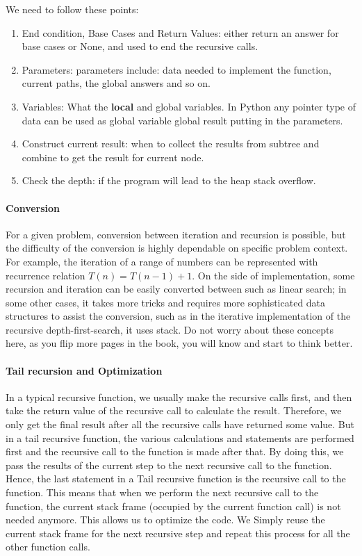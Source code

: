 \documentclass[../main.tex]{subfiles}
\begin{document}
We need to follow these points:
\begin{enumerate}
    \item End condition, Base Cases and Return Values: either return an answer for base cases or None, and used to end the recursive calls.  
    \item Parameters: parameters include: data needed to implement the function, current paths, the global answers and so on. 
    \item Variables: What the \textbf{local} and {global} variables. In Python any pointer type of data can be used as global variable global result putting in the parameters. 
    \item Construct current result: when to collect the results from subtree and combine to get the result for current node.
    \item Check the depth: if the program will lead to the heap stack overflow.
\end{enumerate}


\paragraph{Conversion} For a given problem, conversion between iteration and recursion is possible, but the difficulty of the conversion is highly dependable on specific problem context. For example, the iteration of a range of numbers can be represented with recurrence relation $T(n)=T(n-1)+1$. On the side of implementation, some recursion and iteration can be easily converted between such as linear search; in some other cases, it takes more tricks and requires more sophisticated data structures to assist the conversion, such as in the iterative implementation of the recursive depth-first-search, it uses stack. Do not worry about these concepts here, as you flip more pages in the book, you will know and start to think better. 

\paragraph{Tail recursion and Optimization}

In a typical recursive function, we usually make the recursive calls first, and then take the return value of the recursive call to calculate the result. Therefore, we only get the final result after all the recursive calls have returned some value. But in a tail recursive function, the various calculations and statements are performed first and the recursive call to the function is made after that. By doing this, we pass the results of the current step to the next recursive call to the function. Hence, the last statement in a Tail recursive function is the recursive call to the function.
This means that when we perform the next recursive call to the function, the current stack frame (occupied by the current function call) is not needed anymore. This allows us to optimize the code. We Simply reuse the current stack frame for the next recursive step and repeat this process for all the other function calls.
\end{document}
